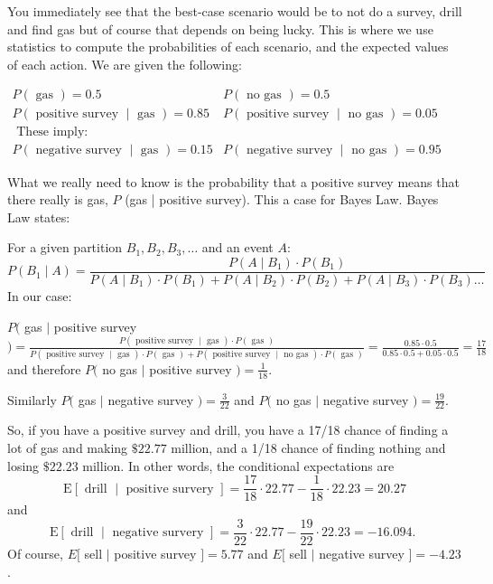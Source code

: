 \documentclass[10pt]{article}
\begin{document}
You immediately see that the best-case scenario would be to not do a survey, drill and find gas but of course that depends on being lucky. This is where we use statistics to compute the probabilities of each scenario, and the expected values of each action. We are given the following:

$\begin{array}{ll}P(\text { gas })=0.5 & P(\text { no gas })=0.5 \\ P(\text { positive survey } \mid \text { gas })=0.85 & P(\text { positive survey } \mid \text { no gas })=0.05 \\ \text { These imply: } & \\ P(\text { negative survey } \mid \text { gas })=0.15 & P(\text { negative survey } \mid \text { no gas })=0.95\end{array}$

What we really need to know is the probability that a positive survey means that there really is gas, $P$ (gas | positive survey). This a case for Bayes Law. Bayes Law states:

For a given partition $B_{1}, B_{2}, B_{3}, \ldots$ and an event $A:$
$$
P\left(B_{1} \mid A\right)=\frac{P\left(A \mid B_{1}\right) \cdot P\left(B_{1}\right)}{P\left(A \mid B_{1}\right) \cdot P\left(B_{1}\right)+P\left(A \mid B_{2}\right) \cdot P\left(B_{2}\right)+P\left(A \mid B_{3}\right) \cdot P\left(B_{3}\right) \ldots}
$$
In our case:

$P($ gas $\mid$ positive survey $)=\frac{P(\text { positive survey } \mid \text { gas }) \cdot P(\text { gas })}{P(\text { positive survey } \mid \text { gas }) \cdot P(\text { gas })+P(\text { positive survey } \mid \text { no gas }) \cdot P(\text { gas })}=\frac{0.85 \cdot 0.5}{0.85 \cdot 0.5+0.05 \cdot 0.5}=\frac{17}{18}$ and therefore $P($ no gas $\mid$ positive survey $)=\frac{1}{18}$.

Similarly $P($ gas $\mid$ negative survey $)=\frac{3}{22}$ and $P($ no gas $\mid$ negative survey $)=\frac{19}{22}$.

So, if you have a positive survey and drill, you have a 17/18 chance of finding a lot of gas and making $\$ 22.77$ million, and a 1/18 chance of finding nothing and losing $\$ 22.23$ million. In other words, the conditional expectations are
$$
\mathrm{E}[\text { drill } \mid \text { positive survery }]=\frac{17}{18} \cdot 22.77-\frac{1}{18} \cdot 22.23=20.27
$$
and
$$
\mathrm{E}[\text { drill } \mid \text { negative survery }]=\frac{3}{22} \cdot 22.77-\frac{19}{22} \cdot 22.23=-16.094 \text {. }
$$
Of course, $E[$ sell $\mid$ positive survey $]=5.77$ and $E[$ sell $\mid$ negative survey $]=-4.23$.
\end{document}
